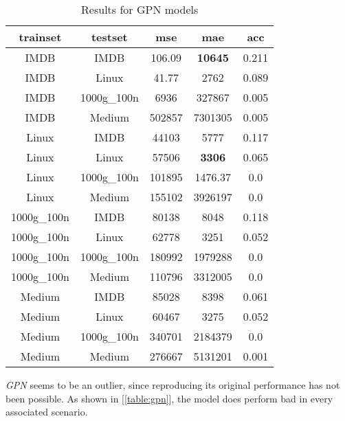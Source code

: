\documentclass[../Thesis.tex]{subfiles}
\begin{document}
	\begin{table}[H]
		\centering
		\setlength\tabcolsep{4pt}
		\renewcommand{\arraystretch}{1.2}
		\begin{tabular}{c|c|c|c|c}
			\toprule
			\textbf{trainset} & \textbf{testset} & \textbf{mse} & \textbf{mae} & \textbf{acc} \\
			\midrule
			IMDB & IMDB & 106.09 & \textbf{10645} & 0.211 \\
			IMDB & Linux & 41.77 & 2762 & 0.089 \\
			IMDB & 1000g\_100n & 6936 & 327867 & 0.005 \\
			IMDB & Medium & 502857 & 7301305 & 0.005 \\ \midrule
			Linux & IMDB & 44103 & 5777 & 0.117 \\
			Linux & Linux & 57506 & \textbf{3306} & 0.065 \\
			Linux & 1000g\_100n & 101895 & 1476.37 & 0.0 \\
			Linux & Medium & 155102 & 3926197 & 0.0 \\ \midrule
			1000g\_100n & IMDB & 80138 & 8048 & 0.118 \\
			1000g\_100n & Linux & 62778 & 3251 & 0.052 \\
			1000g\_100n & 1000g\_100n & 180992 & 1979288 & 0.0 \\
			1000g\_100n & Medium & 110796 & 3312005 & 0.0 \\ \midrule
			Medium & IMDB & 85028 & 8398 & 0.061 \\
			Medium & Linux & 60467 & 3275 & 0.052 \\
			Medium & 1000g\_100n & 340701 & 2184379 & 0.0 \\
			Medium & Medium & 276667 & 5131201 & 0.001 \\
			\bottomrule
		\end{tabular}
		\caption{Results for GPN models}
		\label{table:gpn}
	\end{table}
	
	\emph{GPN} seems to be an outlier, since reproducing its original performance has not been possible. As shown in [\autoref{table:gpn}], the model does perform bad in every associated scenario.
	
\end{document}
